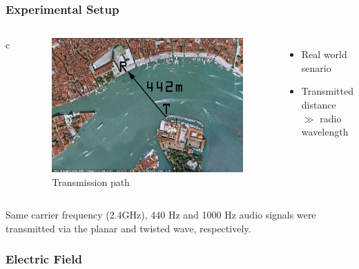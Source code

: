 \documentclass[xcolor=dvipsnames]{beamer}
\newenvironment{items}[1][]
{\begin{itemize}
    \ifthenelse{\isempty{#1}}
    {\setlength{\itemsep}{12pt}}{\setlength{\itemsep}{#1}}}
  {\end{itemize}}
\begin{document}
\begin{frame}
	\frametitle{Experimental Setup}
  \begin{columns}{c}
		\begin{figure}
      \includegraphics[width=\textwidth]{birdeyeview}
      \caption{Transmission path}
      \label{pic:birdeye}
		\end{figure}
		\begin{items}
		\item Real world senario
		\item Transmitted distance $\gg$ radio wavelength
		\end{items}
  \end{columns}
\end{frame}
\begin{frame}
  Same carrier frequency (2.4GHz), 440 Hz and 1000 Hz audio signals
  were transmitted via the planar and twisted wave, respectively.
\end{frame}

\begin{frame}
  \frametitle{Electric Field}
  \begin{columns}[T,totalwidth=\textwidth]
    \begin{figure}[h]
      \centering
    \end{figure}

    \begin{figure}[h]
      \centering
      \vspace{-.6in}
    \end{figure}

  \end{columns}
\end{frame}
\end{document}
